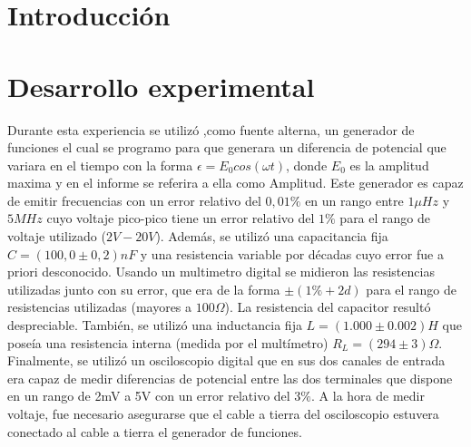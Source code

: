 \documentclass[11pt,a4paper]{article}
\begin{document}
\section{Introducción}\label{sec:intro}




\section{Desarrollo experimental}

Durante esta experiencia se utilizó ,como fuente alterna, un generador de funciones el cual se programo para que generara un diferencia de potencial que variara en el tiempo con la forma $\epsilon = E_{0}cos(\omega t)$, donde $E_{0}$ es la amplitud maxima y en el informe se referira a ella como Amplitud. Este generador es capaz de emitir frecuencias con un error relativo del $0,01\%$ en un rango entre $1\mu Hz$ y $5MHz$ cuyo voltaje pico-pico tiene un error relativo del $1\%$ para el rango de voltaje utilizado ($2V-20V$). Además, se utilizó una capacitancia fija $C = (100,0 \pm 0,2)nF$ y una resistencia variable por décadas cuyo error fue a priori desconocido. Usando un multimetro digital se midieron las resistencias utilizadas junto con su error, que era de la forma $\pm(1\%+2d)$ para el rango de resistencias utilizadas (mayores a $100\Omega$). La resistencia del capacitor resultó despreciable. También, se utilizó una inductancia fija $L = (1.000 \pm 0.002) H$ que poseía una resistencia interna (medida por el multímetro) $R_L = (294 \pm 3) \Omega$.
Finalmente, se utilizó un osciloscopio digital que en sus dos canales de entrada era capaz de medir diferencias de potencial entre las dos terminales que dispone en un rango de 2mV a 5V con un error relativo del $3\%$. A la hora de medir voltaje, fue necesario asegurarse que el cable a tierra del osciloscopio estuvera conectado al cable a tierra el generador de funciones. 
\end{document}
